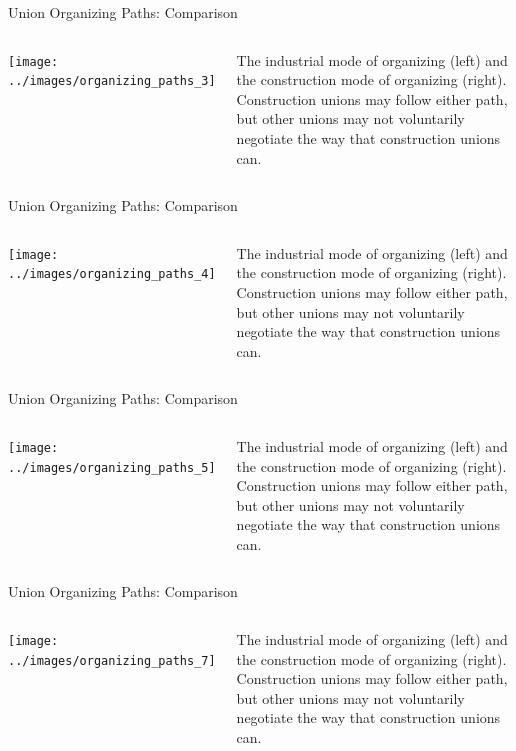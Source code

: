 \documentclass{beamer}
\begin{document}
\begin{frame}{Union Organizing Paths: Comparison} %
  \begin{columns}
    \texttt{[image: ../images/organizing\_paths\_3]}

    The industrial mode of organizing (left) and the construction mode of organizing (right).\newline\newline
    Construction unions may follow either path, but other unions may not voluntarily negotiate the way that construction unions can.
    \end{columns}
\end{frame}

\begin{frame}{Union Organizing Paths: Comparison} %
  \begin{columns}
    \texttt{[image: ../images/organizing\_paths\_4]}

    The industrial mode of organizing (left) and the construction mode of organizing (right).\newline\newline
    Construction unions may follow either path, but other unions may not voluntarily negotiate the way that construction unions can.
    \end{columns}
\end{frame}

\begin{frame}{Union Organizing Paths: Comparison} %
  \begin{columns}
    \texttt{[image: ../images/organizing\_paths\_5]}

    The industrial mode of organizing (left) and the construction mode of organizing (right).\newline\newline
    Construction unions may follow either path, but other unions may not voluntarily negotiate the way that construction unions can.
    \end{columns}
\end{frame}

\begin{frame}{Union Organizing Paths: Comparison} %
  \begin{columns}
    \texttt{[image: ../images/organizing\_paths\_7]}

    The industrial mode of organizing (left) and the construction mode of organizing (right).\newline\newline
    Construction unions may follow either path, but other unions may not voluntarily negotiate the way that construction unions can.
    \end{columns}
\end{frame}
\end{document}
